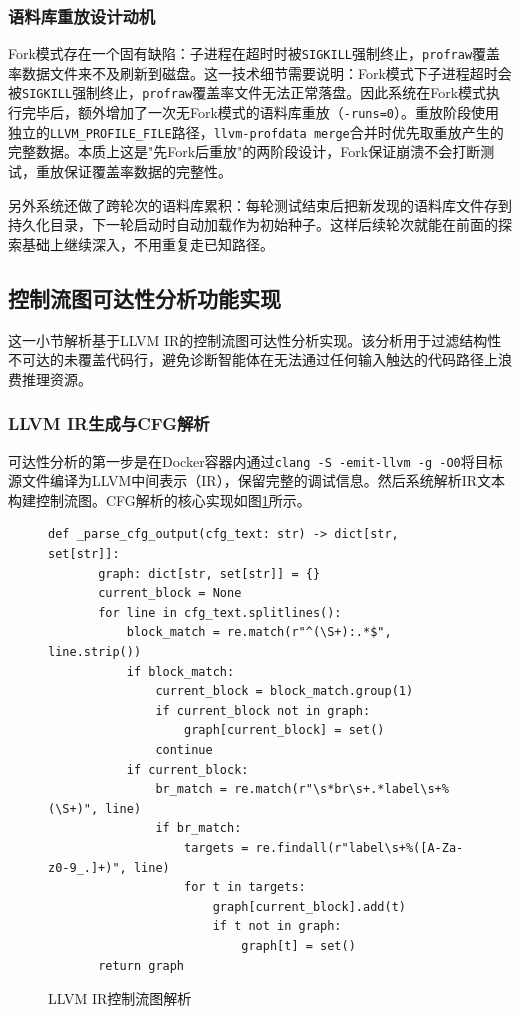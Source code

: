 \subsubsection{语料库重放设计动机}

Fork模式存在一个固有缺陷：子进程在超时时被\texttt{SIGKILL}强制终止，\texttt{profraw}覆盖率数据文件来不及刷新到磁盘。这一技术细节需要说明：Fork模式下子进程超时会被\texttt{SIGKILL}强制终止，\texttt{profraw}覆盖率文件无法正常落盘。因此系统在Fork模式执行完毕后，额外增加了一次无Fork模式的语料库重放（\texttt{-runs=0}）。重放阶段使用独立的\texttt{LLVM\_PROFILE\_FILE}路径，\texttt{llvm-profdata merge}合并时优先取重放产生的完整数据。本质上这是"先Fork后重放"的两阶段设计，Fork保证崩溃不会打断测试，重放保证覆盖率数据的完整性。

另外系统还做了跨轮次的语料库累积：每轮测试结束后把新发现的语料库文件存到持久化目录，下一轮启动时自动加载作为初始种子。这样后续轮次就能在前面的探索基础上继续深入，不用重复走已知路径。

\subsection{控制流图可达性分析功能实现}

这一小节解析基于LLVM IR的控制流图可达性分析实现。该分析用于过滤结构性不可达的未覆盖代码行，避免诊断智能体在无法通过任何输入触达的代码路径上浪费推理资源。

\subsubsection{LLVM IR生成与CFG解析}

可达性分析的第一步是在Docker容器内通过\texttt{clang -S -emit-llvm -g -O0}将目标源文件编译为LLVM中间表示（IR），保留完整的调试信息。然后系统解析IR文本构建控制流图。CFG解析的核心实现如图\ref{fig:parse-cfg}所示。

\begin{figure}[H]
    \centering
    \begin{lstlisting}[style=style@python]
   def _parse_cfg_output(cfg_text: str) -> dict[str, set[str]]:
       graph: dict[str, set[str]] = {}
       current_block = None
       for line in cfg_text.splitlines():
           block_match = re.match(r"^(\S+):.*$", line.strip())
           if block_match:
               current_block = block_match.group(1)
               if current_block not in graph:
                   graph[current_block] = set()
               continue
           if current_block:
               br_match = re.match(r"\s*br\s+.*label\s+%(\S+)", line)
               if br_match:
                   targets = re.findall(r"label\s+%([A-Za-z0-9_.]+)", line)
                   for t in targets:
                       graph[current_block].add(t)
                       if t not in graph:
                           graph[t] = set()
       return graph
    \end{lstlisting}
    \caption{LLVM IR控制流图解析}
    \label{fig:parse-cfg}
\end{figure}

